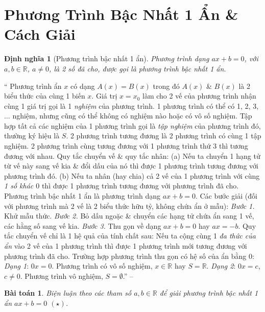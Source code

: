 \documentclass{article}
\newtheorem{baitoan}{Bài toán}
\newtheorem{dinhnghia}{Định nghĩa}
\begin{document}
\section{Phương Trình Bậc Nhất 1 Ẩn \& Cách Giải}

\begin{dinhnghia}[Phương trình bậc nhất 1 ẩn]
	Phương trình dạng $ax + b = 0$, với $a,b\in\mathbb{R}$, $a\ne0$, là 2 số đã cho, được gọi là \emph{phương trình bậc nhất 1 ẩn}.
\end{dinhnghia}

`` Phương trình ẩn $x$ có dạng $A(x) = B(x)$ trong đó $A(x)$ \& $B(x)$ là 2 biểu thức của cùng 1 biến $x$. Giá trị $x = x_0$ làm cho 2 vế của phương trình nhận cùng 1 giá trị gọi là 1 \textit{nghiệm} của phương trình. 1 phương trình có thể có 1, 2, 3, $\ldots$ nghiệm, nhưng cũng có thể không có nghiệm nào hoặc có vô số nghiệm. Tập hợp tất cả các nghiệm của 1 phương trình gọi là \textit{tập nghiệm} của phương trình đó, thường ký hiệu là $S$.  2 phương trình tương đương là 2 phương trình có cùng 1 tập nghiệm. 2 phương trình cùng tương đương với 1 phương trình thứ 3 thì tương đương với nhau.  Quy tắc chuyển vế \& quy tắc nhân: (a) Nếu ta chuyển 1 hạng tử từ vế này sang vế kia \& đổi dấu của nó thì được 1 phương trình tương đương với phương trình đó. (b) Nếu ta nhân (hay chia) cả 2 vế của 1 phương trình với cùng \textit{1 số khác $0$} thì được 1 phương trình tương đương với phương trình đã cho.  Phương trình bậc nhất 1 ẩn là phương trình dạng $ax + b = 0$. Các bước giải (đối với phương trình mà 2 vế là 2 biểu thức hữu tỷ, không chứa ẩn ở mẫu): \textit{Bước 1.} Khử mẫu thức. \textit{Bước 2.} Bỏ dấu ngoặc \& chuyển các hạng tử chứa ẩn sang 1 vế, các hằng số sang vế kia. \textit{Bước 3.} Thu gọn về dạng $ax + b = 0$ hay $ax = -b$.  Quy tắc chuyển vế chỉ là 1 hệ quả của tính chất sau: Nếu ta cộng cùng 1 \textit{đa thức của ẩn} vào 2 vế của 1 phương trình thì được 1 phương trình mới tương đương với phương trình đã cho.  Trường hợp phương trình thu gọn có hệ số của ẩn bằng $0$: \textit{Dạng 1}: $0x = 0$. Phương trình có vô số nghiệm, $x\in\mathbb{R}$ hay $S = \mathbb{R}$. \textit{Dạng 2}: $0x = c$, $c\ne 0$. Phương trình vô nghiệm, $S = \emptyset$.'' -- \cite[Chap. III, \S1, pp. 53--54]{Tuyen_Toan_8}

\begin{baitoan}
	Biện luận theo các tham số $a,b\in\mathbb{R}$ để giải phương trình bậc nhất 1 ẩn $ax + b = 0$ $(\star)$.
\end{baitoan}
\end{document}
